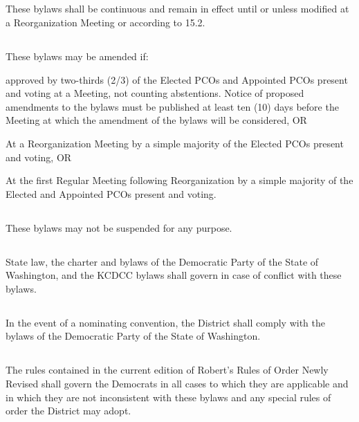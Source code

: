 \subsection{}
These bylaws shall be continuous and remain in effect until or unless modified at a Reorganization Meeting or according to 15.2.

\subsection{}
These bylaws may be amended if:
\begin{inlinealphalist}
    \item approved by two-thirds (2/3) of the Elected PCOs and Appointed PCOs present and voting at a Meeting, not counting abstentions. Notice of proposed amendments to the bylaws must be published at least ten (10) days before the Meeting at which the amendment of the bylaws will be considered, OR
    \item At a Reorganization Meeting by a simple majority of the Elected PCOs present and voting, OR
    \item At the first Regular Meeting following Reorganization by a simple majority of the Elected and Appointed PCOs present and voting.
\end{inlinealphalist}

\subsection{}
These bylaws may not be suspended for any purpose.

\subsection{}
State law, the charter and bylaws of the Democratic Party of the State of Washington, and the KCDCC bylaws shall govern in case of conflict with these bylaws.

\subsection{}
In the event of a nominating convention, the \fortythird{} District  shall comply with the bylaws of the Democratic Party of the State of Washington.

\subsection{}
The rules contained in the current edition of Robert’s Rules of Order Newly Revised shall govern the \fortythird{}  Democrats in all cases to which they are applicable and in which they are not inconsistent with these bylaws and any special rules of order the \fortythird{} District  may adopt.

